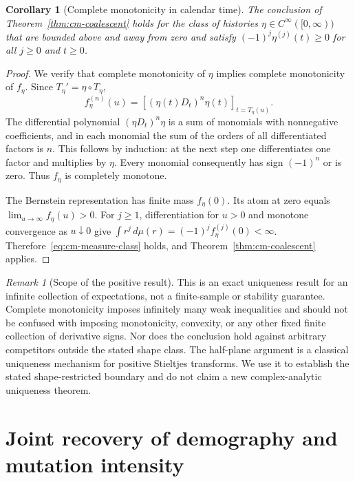 \documentclass[11pt]{article}
\newtheorem{corollary}[theorem]{Corollary}
\theoremstyle{definition}
\theoremstyle{remark}
\newtheorem{remark}[theorem]{Remark}
\numberwithin{equation}{section}
\begin{document}
\begin{corollary}[Complete monotonicity in calendar time]
\label{cor:cm-calendar}
The conclusion of Theorem~\ref{thm:cm-coalescent} holds for the class
of histories $\eta\in C^\infty([0,\infty))$ that are bounded above
and away from zero and satisfy
$(-1)^j\eta^{(j)}(t)\geq0$ for all $j\geq0$ and $t\geq0$.
\end{corollary}
\begin{proof}
We verify that complete monotonicity of $\eta$ implies complete
monotonicity of $f_\eta$.  Since $T_\eta'=\eta\circ T_\eta$,
\[
 f_\eta^{(n)}(u)
 =\left[(\eta(t)D_t)^n\eta(t)\right]_{t=T_\eta(u)}.
\]
The differential polynomial $(\eta D_t)^n\eta$ is a sum of monomials
with nonnegative coefficients, and in each monomial the sum of the
orders of all differentiated factors is $n$.  This follows by induction:
at the next step one differentiates one factor and multiplies by
$\eta$.  Every monomial consequently has sign $(-1)^n$ or is zero.
Thus $f_\eta$ is completely monotone.

The Bernstein representation has finite mass $f_\eta(0)$.
Its atom at zero equals $\lim_{u\to\infty}f_\eta(u)>0$.
For $j\geq1$, differentiation for $u>0$ and monotone convergence as
$u\downarrow0$ give
$\int r^j\,d\mu(r)=(-1)^j f_\eta^{(j)}(0)<\infty$.
Therefore~\eqref{eq:cm-measure-class} holds, and
Theorem~\ref{thm:cm-coalescent} applies.
\end{proof}

\begin{remark}[Scope of the positive result]
This is an exact uniqueness result for an infinite collection of
expectations, not a finite-sample or stability guarantee.  Complete
monotonicity imposes infinitely many weak inequalities and should not
be confused with imposing monotonicity, convexity, or any other fixed
finite collection of derivative signs.  Nor does the conclusion hold
against arbitrary competitors outside the stated shape class.
The half-plane argument is a classical uniqueness mechanism for
positive Stieltjes transforms.  We use it to establish the stated
shape-restricted boundary and do not claim a new complex-analytic
uniqueness theorem.
\end{remark}



\section{Joint recovery of demography and mutation intensity}
\label{sec:mutation}
\end{document}
